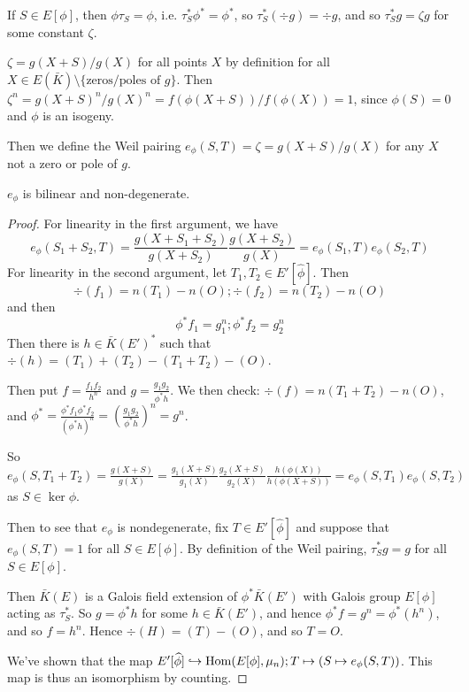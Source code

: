 \documentclass[10pt,a4paper]{article}
\begin{document}
If $S \in E[\phi]$, then $\phi \tau_S = \phi$, i.e. $\tau_S^\ast \phi^\ast = \phi^\ast$, so $\tau_S^\ast (\div g) = \div g$, and so $\tau_S^\ast g = \zeta g$ for some constant $\zeta$.

$\zeta = g(X+S)/g(X)$ for all points $X$ by definition for all $X \in E(\bar{K}) \setminus \{\text{zeros/poles of $g$}\}$. Then $\zeta^n = g(X+S)^n/g(X)^n = f(\phi(X+S))/f(\phi(X)) = 1$, since $\phi(S) = 0$ and $\phi$ is an isogeny.

Then we define the Weil pairing $e_\phi(S,T) = \zeta = g(X+S)/g(X)$ for any $X$ not a zero or pole of $g$.

\begin{proposition}
  $e_\phi$ is bilinear and non-degenerate.
\end{proposition}
\begin{proof}
  For linearity in the first argument, we have
  \[e_\phi(S_1+S_2,T) = \frac{g(X+S_1+S_2)}{g(X+S_2)}\frac{g(X+S_2)}{g(X)} = e_\phi(S_1,T)e_\phi(S_2,T)\]
  For linearity in the second argument, let $T_1, T_2 \in E'[\hat{\phi}]$. Then
  \[\div(f_1) = n(T_1)-n(O); \div(f_2) = n(T_2)-n(O)\]
  and then
  \[\phi^\ast f_1 = g_1^n; \phi^\ast f_2 = g_2^n\]
  Then there is $h \in \bar{K}(E')^\ast$ such that $\div(h) = (T_1)+(T_2)-(T_1+T_2)-(O)$.

  Then put $f = \frac{f_1f_2}{h^n}$ and $g = \frac{g_1g_2}{\phi^\ast h}$. We then check: $\div(f) = n(T_1+T_2)-n(O)$, and $\phi^\ast = \frac{\phi^\ast f_1 \phi^\ast f_2}{(\phi^\ast h)^n} = \left(\frac{g_1g_2}{\phi^\ast h}\right)^n = g^n$.

  So $e_\phi(S, T_1+T_2) = \frac{g(X+S)}{g(X)} = \frac{g_1(X+S)}{g_1(X)}\frac{g_2(X+S)}{g_2(X)}\frac{h(\phi(X))}{h(\phi(X+S))} = e_\phi(S,T_1)e_\phi(S,T_2)$ as $S \in \ker \phi$.

  Then to see that $e_\phi$ is nondegenerate, fix $T \in E'[\hat{\phi}]$ and suppose that $e_\phi(S,T)=1$ for all $S \in E[\phi]$. By definition of the Weil pairing, $\tau_S^\ast g = g$ for all $S \in E[\phi]$.

  Then $\bar{K}(E)$ is a Galois field extension of $\phi^\ast \bar{K}(E')$ with Galois group $E[\phi]$ acting as $\tau_S^\ast$. So $g = \phi^\ast h$ for some $h \in \bar{K}(E')$, and hence $\phi^\ast f = g^n = \phi^\ast(h^n)$, and so $f= h^n$. Hence $\div(H) = (T)-(O)$, and so $T = O$.

  We've shown that the map $E'[\widehat{\phi}] \hookrightarrow \operatorname{Hom}(E[\phi], \mu_n); T \mapsto (S \mapsto e_\phi(S,T))$. This map is thus an isomorphism by counting.
\end{proof}
\end{document}
